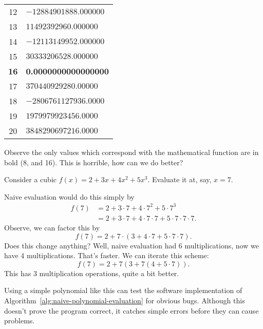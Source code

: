 \begin{ex}
\begin{center}
\begin{tabular}{c|l}
      12 &  $-12884901888.000000$      \\
      13 &   $11492392960.000000$      \\
      14 &  $-12113149952.000000$      \\
      15 &   $30333206528.000000$      \\
      \textbf{16} & \textbf{0.0000000000000000}      \\
      17 &   $370440929280.00000$      \\
      18 &  $-2806761127936.0000$      \\
      19 &   $1979979923456.0000$      \\
      20 &   $3848290697216.0000$      \\
    \end{tabular}
  \end{center}
  Observe the only values which correspond with the mathematical
  function are in bold (8, and 16). This is horrible, how can we do better?
\end{ex}

\begin{ex}\label{ex:polynomial-evaluation:motivation-horner}
  Consider a cubic $f(x)=2+3x+4x^{2}+5x^{3}$. Evaluate it at, say,
  $x=7$.

  Naive evaluation would do this simply by
  \begin{equation}
    \begin{split}
      f(7) &= 2 + 3\cdot7 + 4\cdot 7^{2} + 5\cdot 7^{3}\\
      &=2 + 3\cdot7 + 4\cdot7\cdot7 + 5\cdot7\cdot7\cdot7.
    \end{split}
  \end{equation}
  Observe, we can factor this by
  \begin{equation}
    f(7) = 2 + 7\cdot(3 + 4\cdot7 + 5\cdot 7\cdot7).
  \end{equation}
  Does this change anything? Well, naive evaluation had 6
  multiplications, now we have 4 multiplications. That's faster. We can
  iterate this scheme:
  \begin{equation}
    f(7) = 2 + 7(3 + 7(4 + 5\cdot7)).
  \end{equation}
  This has 3 multiplication operations, quite a bit better.
\end{ex}
\begin{lesson}
  Using a simple polynomial like this can test the software
  implementation of Algorithm~\ref{alg:naive-polynomial-evaluation}
  for obvious bugs. Although this doesn't prove the program correct, it
  catches simple errors before they can cause problems.
\end{lesson}

